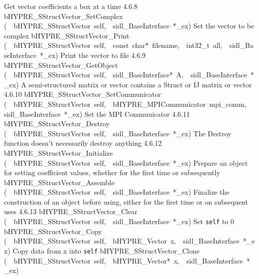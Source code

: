 \documentclass{article}
\begin{document}
\begin{cxxentry}
\begin{cxxentry}
\begin{cxxnames}
        {
Get vector coefficients a box at a time}
        {4.6.8}
        {bHYPRE\_SStructVector\_SetComplex}
        {(\ \ bHYPRE\_SStructVector\ self,\ \ sidl\_BaseInterface\ *\_ex)}
        {
Set the vector to be complex}
        {}
\label{cxx.4.6.23}
        {bHYPRE\_SStructVector\_Print}
        {(\ \ bHYPRE\_SStructVector\ self,\ \ const\ char*\ filename,\ \ int32\_t\ all,\ \ sidl\_BaseInterface\ *\_ex)}
        {
Print the vector to file}
        {4.6.9}
        {bHYPRE\_SStructVector\_GetObject}
        {(\ \ bHYPRE\_SStructVector\ self,\ \ sidl\_BaseInterface*\ A,\ \ sidl\_BaseInterface\ *\_ex)}
        {
A semi-structured matrix or vector contains a Struct or IJ matrix
or vector}
        {4.6.10}
        {bHYPRE\_SStructVector\_SetCommunicator}
        {(\ \ bHYPRE\_SStructVector\ self,\ \ bHYPRE\_MPICommunicator\ mpi\_comm,\ \ sidl\_BaseInterface\ *\_ex)}
        {
Set the MPI Communicator}
        {4.6.11}
        {bHYPRE\_SStructVector\_Destroy}
        {(\ \ bHYPRE\_SStructVector\ self,\ \ sidl\_BaseInterface\ *\_ex)}
        {
The Destroy function doesn't necessarily destroy anything}
        {4.6.12}
        {bHYPRE\_SStructVector\_Initialize}
        {(\ \ bHYPRE\_SStructVector\ self,\ \ sidl\_BaseInterface\ *\_ex)}
        {
Prepare an object for setting coefficient values, whether for
the first time or subsequently}
        {}
\label{cxx.4.6.24}
        {bHYPRE\_SStructVector\_Assemble}
        {(\ \ bHYPRE\_SStructVector\ self,\ \ sidl\_BaseInterface\ *\_ex)}
        {
Finalize the construction of an object before using, either
for the first time or on subsequent uses}
        {4.6.13}
        {bHYPRE\_SStructVector\_Clear}
        {(\ \ bHYPRE\_SStructVector\ self,\ \ sidl\_BaseInterface\ *\_ex)}
        {
Set {\tt self} to 0}
        {}
\label{cxx.4.6.25}
        {bHYPRE\_SStructVector\_Copy}
        {(\ \ bHYPRE\_SStructVector\ self,\ \ bHYPRE\_Vector\ x,\ \ sidl\_BaseInterface\ *\_ex)}
        {
Copy data from x into {\tt self}}
        {}
\label{cxx.4.6.26}
        {bHYPRE\_SStructVector\_Clone}
        {(\ \ bHYPRE\_SStructVector\ self,\ \ bHYPRE\_Vector*\ x,\ \ sidl\_BaseInterface\ *\_ex)}

\end{cxxnames}
\end{cxxentry}
\end{cxxentry}
\end{document}
